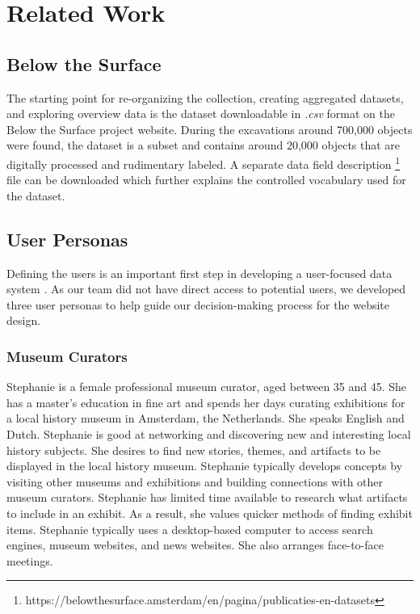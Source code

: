 \section{Related Work}

\subsection{Below the Surface}

The starting point for re-organizing the collection, creating aggregated datasets, and exploring overview data is the dataset downloadable in \textit{.csv} format on the Below the Surface project website. During the excavations around 700,000 objects were found, the dataset is a subset and contains around 20,000 objects that are digitally processed and rudimentary labeled. A separate data field description \footnote{https://belowthesurface.amsterdam/en/pagina/publicaties-en-datasets} file can be downloaded which further explains the controlled vocabulary used for the dataset.

\subsection{User Personas}

Defining the users is an important first step in developing a user-focused data system \cite{personas}. As our team did not have direct access to potential users, we developed three user personas to help guide our decision-making process for the website design.  

\subsubsection{Museum Curators}

Stephanie is a female professional museum curator, aged between 35 and 45.  She has a master's education in fine art and spends her days curating exhibitions for a local history museum in Amsterdam, the Netherlands.  She speaks English and Dutch.  Stephanie is good at networking and discovering new and interesting local history subjects.  She desires to find new stories, themes, and artifacts to be displayed in the local history museum.  Stephanie typically develops concepts by visiting other museums and exhibitions and building connections with other museum curators.  Stephanie has limited time available to research what artifacts to include in an exhibit. As a result, she values quicker methods of finding exhibit items.  Stephanie typically uses a desktop-based computer to access search engines, museum websites, and news websites.  She also arranges face-to-face meetings.


